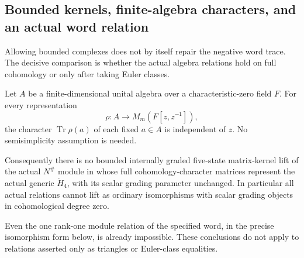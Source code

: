\subsection{Bounded kernels, finite-algebra characters, and an actual word relation}
Allowing bounded complexes does not by itself repair the negative
word trace. The decisive comparison is whether the actual algebra
relations hold on full cohomology or only after taking Euler classes.

\begin{finding}
\label{f:boundedkernelcharactergate}
Let \(A\) be a finite-dimensional unital algebra over a
characteristic-zero field \(F\). For every representation
\[
\rho:A\longrightarrow M_m(F[z,z^{-1}]),
\]
the character \(\operatorname{Tr}\rho(a)\) of each fixed
\(a\in A\) is independent of \(z\).
No semisimplicity assumption is needed.

Consequently there is no bounded internally graded five-state
matrix-kernel lift of the actual \(N^\#\) module in 
whose full cohomology-character matrices represent the actual
generic \(\check H_4\), with its scalar grading parameter unchanged.
In particular all actual relations cannot lift as ordinary
isomorphisms with scalar grading objects in cohomological degree zero.

Even the one rank-one module relation of the specified word,
in the precise isomorphism form below, is already impossible.
These conclusions do not apply to relations asserted only as
triangles or Euler-class equalities.
\end{finding}

